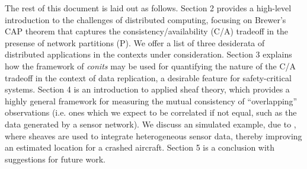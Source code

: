 The rest of this document is laid out as follows. Section 2 provides a
high-level introduction to the challenges of distributed computing,
focusing on Brewer's CAP theorem that captures the
consistency/availability (C/A) tradeoff in the presense of network
partitions (P). We offer a list of three desiderata of distributed
applications in the contexts under consideration.  Section 3 explains
how the framework of \emph{conits} \cite{} may be used for quantifying
the nature of the C/A tradeoff in the context of data replication, a
desirable feature for safety-critical systems. Section 4 is an
introduction to applied sheaf theory, which provides a highly general
framework for measuring the mutual consistency of ``overlapping''
observations (i.e. ones which we expect to be correlated if not equal,
such as the data generated by a sensor network). We discuss an
simulated example, due to \cite{}, where sheaves are used to integrate
heterogeneous sensor data, thereby improving an estimated location for
a crashed aircraft. Section 5 is a conclusion with suggestions for
future work.
